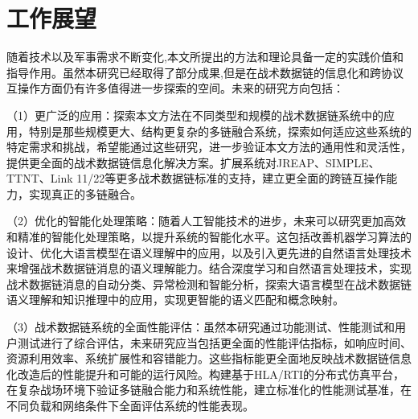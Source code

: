 \section{工作展望}

随着技术以及军事需求不断变化,本文所提出的方法和理论具备一定的实践价值和指导作用。虽然本研究已经取得了部分成果,但是在战术数据链的信息化和跨协议互操作方面仍有许多值得进一步探索的空间。未来的研究方向包括：

（1）更广泛的应用：探索本文方法在不同类型和规模的战术数据链系统中的应用，特别是那些规模更大、结构更复杂的多链融合系统，探索如何适应这些系统的特定需求和挑战，希望能通过这些研究，进一步验证本文方法的通用性和灵活性，提供更全面的战术数据链信息化解决方案。扩展系统对JREAP、SIMPLE、TTNT、Link 11/22等更多战术数据链标准的支持，建立更全面的跨链互操作能力，实现真正的多链融合。

（2）优化的智能化处理策略：随着人工智能技术的进步，未来可以研究更加高效和精准的智能化处理策略，以提升系统的智能化水平。这包括改善机器学习算法的设计、优化大语言模型在语义理解中的应用，以及引入更先进的自然语言处理技术来增强战术数据链消息的语义理解能力。结合深度学习和自然语言处理技术，实现战术数据链消息的自动分类、异常检测和智能分析，探索大语言模型在战术数据链语义理解和知识推理中的应用，实现更智能的语义匹配和概念映射。

（3）战术数据链系统的全面性能评估：虽然本研究通过功能测试、性能测试和用户测试进行了综合评估，未来研究应当包括更全面的性能评估指标，如响应时间、资源利用效率、系统扩展性和容错能力。这些指标能更全面地反映战术数据链信息化改造后的性能提升和可能的运行风险。构建基于HLA/RTI的分布式仿真平台，在复杂战场环境下验证多链融合能力和系统性能，建立标准化的性能测试基准，在不同负载和网络条件下全面评估系统的性能表现。

